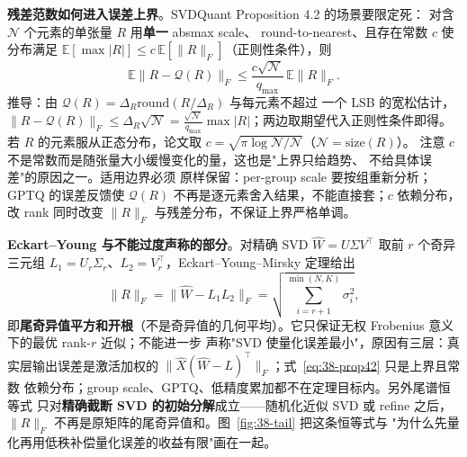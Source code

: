 \textbf{残差范数如何进入误差上界}。SVDQuant Proposition 4.2 的场景要限定死：
对含 $\mathcal N$ 个元素的单张量 $R$ 用\textbf{单一} absmax scale、
round-to-nearest、且存在常数 $c$ 使分布满足
$\mathbb E[\max|R|]\le c\,\mathbb E[\|R\|_F]$（正则性条件），则
\begin{equation}
  \mathbb E\|R-\mathcal Q(R)\|_F
  \le\frac{c\sqrt{\mathcal N}}{q_{\max}}\,\mathbb E\|R\|_F.
  \label{eq:38-prop42}
\end{equation}
推导：由 $\mathcal Q(R)=\Delta_R\mathrm{round}(R/\Delta_R)$ 与每元素不超过
一个 LSB 的宽松估计，
$\|R-\mathcal Q(R)\|_F\le\Delta_R\sqrt{\mathcal N}
=\frac{\sqrt{\mathcal N}}{q_{\max}}\max|R|$；两边取期望代入正则性条件即得。
若 $R$ 的元素服从正态分布，论文取
$c=\sqrt{\pi\log\mathcal N/\mathcal N}$（$\mathcal N=\text{size}(R)$）。
注意 $c$ 不是常数而是随张量大小缓慢变化的量，这也是"上界只给趋势、
不给具体误差"的原因之一。适用边界必须
原样保留：per-group scale 要按组重新分析；GPTQ 的误差反馈使 $\mathcal Q(R)$
不再是逐元素舍入结果，不能直接套；$c$ 依赖分布，改 rank 同时改变 $\|R\|_F$
与残差分布，不保证上界严格单调。

\textbf{Eckart--Young 与不能过度声称的部分}。对精确 SVD
$\widehat W=U\Sigma V^{\top}$ 取前 $r$ 个奇异三元组
$L_1=U_r\Sigma_r$、$L_2=V_r^{\top}$，Eckart--Young--Mirsky 定理给出
\begin{equation}
  \|R\|_F=\|\widehat W-L_1L_2\|_F=\sqrt{\sum_{i=r+1}^{\min(N,K)}\sigma_i^2},
  \label{eq:38-tail}
\end{equation}
即\textbf{尾奇异值平方和开根}（不是奇异值的几何平均）。它只保证无权
Frobenius 意义下的最优 rank-$r$ 近似；不能进一步
声称"SVD 使量化误差最小"，原因有三层：真实层输出误差是激活加权的
$\|\widehat X(\widehat W-L)^{\top}\|_F$；式~\ref{eq:38-prop42} 只是上界且常数
依赖分布；group scale、GPTQ、低精度累加都不在定理目标内。另外尾谱恒等式
只对\textbf{精确截断 SVD 的初始分解}成立——随机化近似 SVD 或 refine 之后，
$\|R\|_F$ 不再是原矩阵的尾奇异值和。图~\ref{fig:38-tail} 把这条恒等式与
"为什么先量化再用低秩补偿量化误差的收益有限"画在一起。

